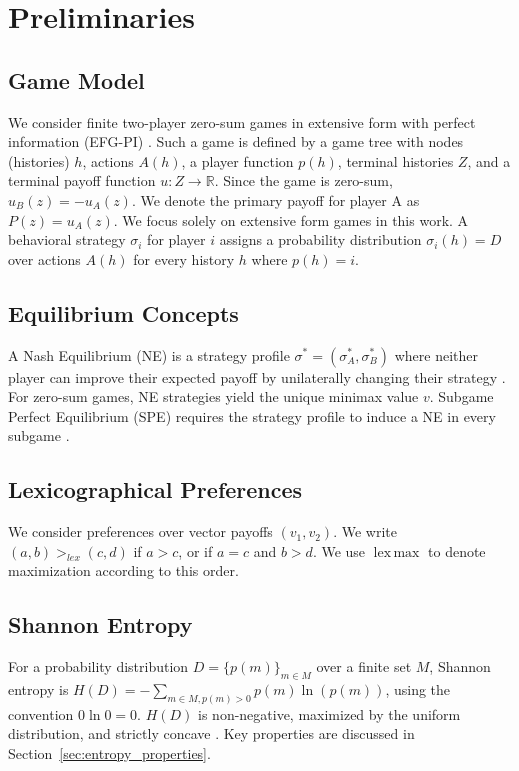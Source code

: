 \documentclass{article}
\DeclareMathOperator*{\lexmax}{lex\,max}
\begin{document}
\section{Preliminaries}

\subsection{Game Model}
We consider finite two-player zero-sum games in extensive form with perfect information (EFG-PI) \cite{placeholder_osborne_rubinstein}. Such a game is defined by a game tree with nodes (histories) $h$, actions $A(h)$, a player function $p(h)$, terminal histories $Z$, and a terminal payoff function $u: Z \to \mathbb{R}$. Since the game is zero-sum, $u_B(z) = -u_A(z)$. We denote the primary payoff for player A as $P(z) = u_A(z)$. We focus solely on extensive form games in this work. A behavioral strategy $\sigma_i$ for player $i$ assigns a probability distribution $\sigma_i(h) = D$ over actions $A(h)$ for every history $h$ where $p(h) = i$.

\subsection{Equilibrium Concepts}
A Nash Equilibrium (NE) is a strategy profile $\sigma^* = (\sigma_A^*, \sigma_B^*)$ where neither player can improve their expected payoff by unilaterally changing their strategy \cite{placeholder_nash}. For zero-sum games, NE strategies yield the unique minimax value $v$. Subgame Perfect Equilibrium (SPE) requires the strategy profile to induce a NE in every subgame \cite{placeholder_selten_spe}.

\subsection{Lexicographical Preferences}
We consider preferences over vector payoffs $(v_1, v_2)$. We write $(a, b) >_{lex} (c, d)$ if $a > c$, or if $a = c$ and $b > d$. We use $\lexmax$ to denote maximization according to this order.

\subsection{Shannon Entropy}
For a probability distribution $D = \{p(m)\}_{m \in M}$ over a finite set $M$, Shannon entropy is $H(D) = - \sum_{m \in M, p(m)>0} p(m) \ln(p(m))$, using the convention $0 \ln 0 = 0$. $H(D)$ is non-negative, maximized by the uniform distribution, and strictly concave \cite{placeholder_cover_thomas}. Key properties are discussed in Section~\ref{sec:entropy_properties}.
\end{document}
